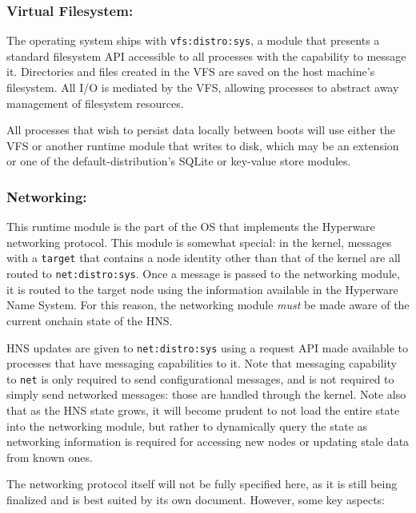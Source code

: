 \documentclass[runningheads]{llncs}
\begin{document}
\subsubsection{Virtual Filesystem:}
\label{sec:osvfs}

The operating system ships with \verb|vfs:distro:sys|, a module that presents a standard filesystem API accessible to all processes with the capability to message it.
Directories and files created in the VFS are saved on the host machine's filesystem.
All I/O is mediated by the VFS, allowing processes to abstract away management of filesystem resources.

All processes that wish to persist data locally between boots will use either the VFS or another runtime module that writes to disk, which may be an extension or one of the default-distribution's SQLite or key-value store modules.

\subsubsection{Networking:}
\label{sec:osnetworking}

This runtime module is the part of the OS that implements the Hyperware networking protocol.
This module is somewhat special: in the kernel, messages with a \verb|target| that contains a node identity other than that of the kernel are all routed to \verb|net:distro:sys|.
Once a message is passed to the networking module, it is routed to the target node using the information available in the Hyperware Name System.
For this reason, the networking module \textit{must} be made aware of the current onchain state of the HNS.

HNS updates are given to \verb|net:distro:sys| using a request API made available to processes that have messaging capabilities to it.
Note that messaging capability to \verb|net| is only required to send configurational messages, and is not required to simply send networked messages: those are handled through the kernel.
Note also that as the HNS state grows, it will become prudent to not load the entire state into the networking module, but rather to dynamically query the state as networking information is required for accessing new nodes or updating stale data from known ones.

The networking protocol itself will not be fully specified here, as it is still being finalized and is best suited by its own document. However, some key aspects:
\end{document}
